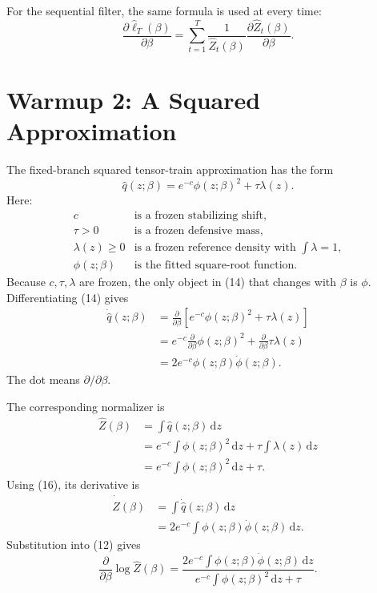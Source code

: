 \documentclass[11pt]{article}
\theoremstyle{remark}
\newcommand{\dd}{\,\mathrm d}
\newcommand{\widehatell}{\widehat\ell}
\begin{document}
For the sequential filter, the same formula is used at every time:
\[
    \frac{\partial\widehatell_T(\beta)}{\partial\beta}
    =
    \sum_{t=1}^{T}
    \frac{1}{\widehat Z_t(\beta)}
    \frac{\partial\widehat Z_t(\beta)}{\partial\beta}.
    \tag{13}
\]

\section{Warmup 2: A Squared Approximation}

The fixed-branch squared tensor-train approximation has the form
\[
    \widehat q(z;\beta)
    =
    e^{-c}\phi(z;\beta)^2+\tau\lambda(z).
    \tag{14}
\]
Here:
\[
\begin{array}{ll}
c & \text{is a frozen stabilizing shift},\\
\tau>0 & \text{is a frozen defensive mass},\\
\lambda(z)\ge0 & \text{is a frozen reference density with }\int\lambda=1,\\
\phi(z;\beta) & \text{is the fitted square-root function.}
\end{array}
\tag{15}
\]
Because \(c,\tau,\lambda\) are frozen, the only object in (14) that changes
with \(\beta\) is \(\phi\).  Differentiating (14) gives
\[
\begin{aligned}
    \dot{\widehat q}(z;\beta)
    &=
    \frac{\partial}{\partial\beta}
    \left[
    e^{-c}\phi(z;\beta)^2+\tau\lambda(z)
    \right]\\
    &=
    e^{-c}
    \frac{\partial}{\partial\beta}\phi(z;\beta)^2
    +
    \frac{\partial}{\partial\beta}\tau\lambda(z)\\
    &=
    2e^{-c}\phi(z;\beta)\dot\phi(z;\beta).
\end{aligned}
\tag{16}
\]
The dot means \(\partial/\partial\beta\).

The corresponding normalizer is
\[
\begin{aligned}
    \widehat Z(\beta)
    &=
    \int \widehat q(z;\beta)\dd z\\
    &=
    e^{-c}\int \phi(z;\beta)^2\dd z
    +
    \tau\int\lambda(z)\dd z\\
    &=
    e^{-c}\int \phi(z;\beta)^2\dd z+\tau.
\end{aligned}
\tag{17}
\]
Using (16), its derivative is
\[
\begin{aligned}
    \dot{\widehat Z}(\beta)
    &=
    \int \dot{\widehat q}(z;\beta)\dd z\\
    &=
    2e^{-c}
    \int \phi(z;\beta)\dot\phi(z;\beta)\dd z.
\end{aligned}
\tag{18}
\]
Substitution into (12) gives
\[
    \frac{\partial}{\partial\beta}\log\widehat Z(\beta)
    =
    \frac{
    2e^{-c}\int \phi(z;\beta)\dot\phi(z;\beta)\dd z}
    {e^{-c}\int\phi(z;\beta)^2\dd z+\tau}.
    \tag{19}
\]
\end{document}
